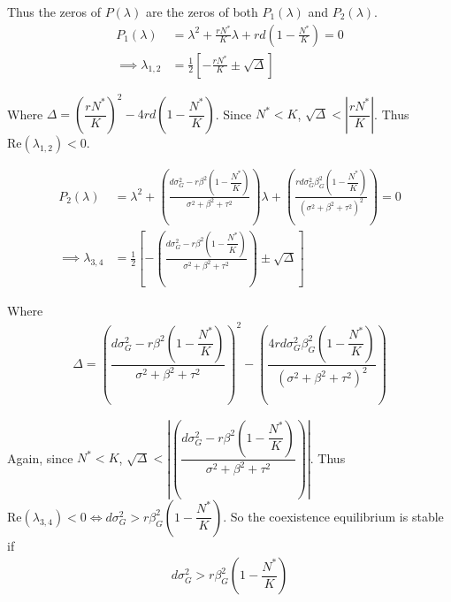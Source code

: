 \documentclass[12pt]{article}
\begin{document}
\noindent Thus the zeros of $P(\lambda)$ are the zeros of both $P_1(\lambda)$ and $P_2(\lambda)$.
\begin{align*}
	P_1(\lambda) &= \lambda^2 + \frac{rN^*}{K}\lambda + rd\left(1 - \frac{N^*}{K}\right) = 0 \\
	\implies \lambda_{1,2} &= \frac{1}{2}\left[-\frac{rN^*}{K} \pm \sqrt{\Delta}\right]
\end{align*}

\noindent Where $\Delta = \left(\dfrac{rN^*}{K}\right)^2 - 4rd\left(1 - \dfrac{N^*}{K}\right)$.  Since $N^* < K$, $\sqrt{\Delta} < \left|{\dfrac{rN^*}{K}}\right|$.  Thus $\text{Re} (\lambda_{1,2}) < 0$.

\begin{align*}
	P_2(\lambda) &= \lambda^2 + \left(\frac{d\sigma_G^2-r\beta^2\left(1 - \dfrac{N^*}{K}\right)}{\sigma^2 + \beta^2 + \tau^2}\right)\lambda + \left(\frac{rd\sigma_G^2\beta_G^2\left(1 - \dfrac{N^*}{K}\right)}{(\sigma^2 + \beta^2 + \tau^2)^2}\right) = 0 \\
	\implies \lambda_{3,4} &= \frac{1}{2}\left[-\left(\frac{d\sigma_G^2-r\beta^2\left(1 - \dfrac{N^*}{K}\right)}{\sigma^2 + \beta^2 + \tau^2}\right) \pm \sqrt{\Delta}\right]
\end{align*}

\noindent Where
\begin{align*}
	\Delta = \left(\dfrac{d\sigma_G^2-r\beta^2\left(1 - \dfrac{N^*}{K}\right)}{\sigma^2 + \beta^2 + \tau^2}\right)^2 - \left(\dfrac{4rd\sigma_G^2\beta_G^2\left(1 - \dfrac{N^*}{K}\right)}{(\sigma^2 + \beta^2 + \tau^2)^2}\right)
\end{align*} 

\noindent Again, since $N^* < K$, $\sqrt{\Delta} < \left|\left(\dfrac{d\sigma_G^2-r\beta^2\left(1 - \dfrac{N^*}{K}\right)}{\sigma^2 + \beta^2 + \tau^2}\right)\right|$. Thus $\text{Re} (\lambda_{3,4}) < 0 \iff d\sigma_G^2 > r\beta_G^2\left(1 - \dfrac{N^*}{K}\right)$.  So the coexistence equilibrium is stable if 
\begin{align*}
	d\sigma_G^2 > r\beta_G^2\left(1 - \dfrac{N^*}{K}\right)
\end{align*}
\end{document}
